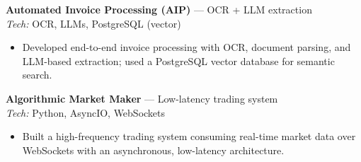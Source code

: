 \documentclass[10pt,letterpaper]{article}
\begin{document}
\textbf{Automated Invoice Processing (AIP)} — OCR + LLM extraction \hfill \\
\emph{Tech:} OCR, LLMs, PostgreSQL (vector)\\
\begin{itemize}
  \item Developed end-to-end invoice processing with OCR, document parsing, and LLM-based extraction; used a PostgreSQL vector database for semantic search.
\end{itemize}

\textbf{Algorithmic Market Maker} — Low-latency trading system \hfill \\
\emph{Tech:} Python, AsyncIO, WebSockets\\
\begin{itemize}
  \item Built a high-frequency trading system consuming real-time market data over WebSockets with an asynchronous, low-latency architecture.
\end{itemize}

\end{document}

